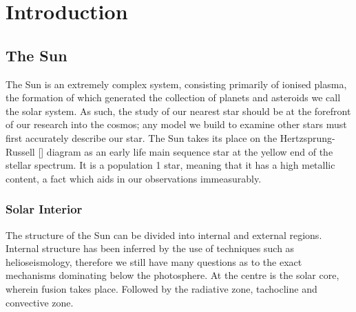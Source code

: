 
\newcommand{\pd}[2]{\frac{\partial #1}{\partial #2 }}
\newcommand{\td}[2]{\frac{d #1}{d #2 }}
\newcommand{\mb}[1]{\mathbf{#1}}
\newcommand{\divv}[1]{\bigtriangledown{#1}}
\newcommand{\del}{\bigtriangledown}

\label{ch:Intro}
\chapter{Introduction}  %





\section{The Sun}
The Sun is an extremely complex system, consisting primarily of ionised plasma, the formation of which generated the collection of planets and asteroids we call the solar system.
As such, the study of our nearest star should be at the forefront of our research into the cosmos; any model we build to examine other stars must first accurately describe our star. 
The Sun takes its place on the Hertzsprung-Russell [\cite{Hertzsprung1909, Russell1914}] diagram as an early life main sequence star at the yellow end of the stellar spectrum.
It is a population 1 star, meaning that it has a high metallic content, a fact which aids in our observations immeasurably.

\subsection{Solar Interior}

The structure of the Sun can be divided into internal and external regions.
Internal structure has been inferred by the use of techniques such as helioseismology, therefore we still have many questions as to the exact mechanisms dominating below the photosphere.
At the centre is the solar core, wherein fusion takes place. 
Followed by the radiative zone, tachocline and convective zone.

